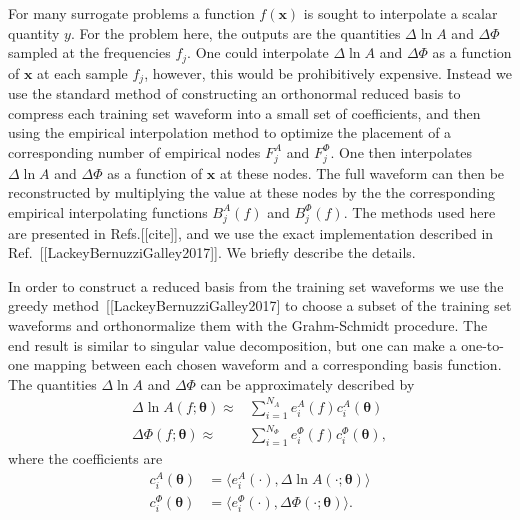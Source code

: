 \documentclass[prd,aps,letter,twocolumn,floatfix,notitlepage,nofootinbib]{revtex4-1}
\def\btheta{\boldsymbol{\theta}}
\begin{document}
For many surrogate problems a function $f({\bm x})$ is sought to interpolate a scalar quantity $y$. For the
problem here, the outputs are the quantities $\Delta\ln A$ and $\Delta\Phi$ sampled at the frequencies $f_j$. 
One could interpolate $\Delta\ln A$ and $\Delta\Phi$ as a function of ${\bm x}$ at each sample $f_j$, 
however, this would be prohibitively expensive. Instead we use the standard method of constructing an
orthonormal reduced basis to compress each training set waveform into a small set of coefficients, 
and then using the empirical interpolation method
to optimize the placement of a corresponding number of empirical nodes $F^A_j$ and $F^\Phi_j$. One then interpolates
$\Delta\ln A$ and $\Delta\Phi$ as a function of ${\bm x}$ at these nodes. The full waveform can then be reconstructed by 
multiplying the value at these nodes by the the corresponding empirical interpolating functions $B_j^A(f)$ and $B_j^\Phi(f)$. 
The methods used here are presented in Refs.[[cite]], and we use the exact implementation described in 
Ref.~[[LackeyBernuzziGalley2017]]. We briefly describe the details.

In order to construct a reduced basis from the training set waveforms we use the greedy method~[[LackeyBernuzziGalley2017]
to choose a subset of the training set waveforms and orthonormalize them with the Grahm-Schmidt procedure. The end result
is similar to singular value decomposition, but one can make a one-to-one mapping between each chosen waveform and a 
corresponding basis function. The quantities $\Delta\ln A$ and $\Delta\Phi$ can be approximately described by
\begin{subequations}
\label{eq:basis1}
\begin{align}
\Delta\ln A(f; \btheta) \approx {} & \sum_{i=1}^{N_A} e^A_i(f) c^A_i(\btheta)\\
\Delta\Phi(f; \btheta) \approx {} & \sum_{i=1}^{N_\Phi} e^\Phi_i(f) c^\Phi_i(\btheta),
\end{align}
\end{subequations}
where the coefficients are
\begin{subequations}
\label{eq:basiscoeffs1}
\begin{align}
c_i^A(\btheta) & = \langle e_i^A(\cdot) , \Delta\ln A(\cdot; \btheta) \rangle \\
c_i^\Phi(\btheta) & = \langle e_i^\Phi(\cdot) , \Delta\Phi(\cdot; \btheta) \rangle  .
\end{align}
\end{subequations}
\end{document}
